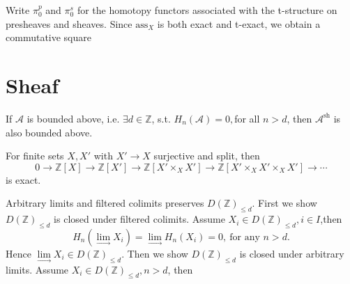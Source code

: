 \documentclass[UTF8,12,a4paper]{ctexart}
\theoremstyle{definition}
\begin{document}
Write $\pi_0^p$ and $\pi_0^s$ for the homotopy functors associated with the t-structure on presheaves and sheaves. Since $\text{ass}_X$ is both exact and t-exact, we obtain a commutative square

\begin{center}
\end{center}

























\newpage
\section{Sheaf}

\lem
If $\mathcal{A}$ is bounded above, i.e. $\exists d\in\mathbb{Z}$, s.t. $H_n (\mathcal{A})=0,$for all $n>d$, then $\mathcal{A}^{\text{sh}}$ is also bounded above.


\Q
For finite sets $X, X'$ with $X'\to X$ surjective and split, then 
$$
0\rightarrow\mathbb{Z}\left[X\right]\rightarrow\mathbb{Z}\left[X'\right]\rightarrow\mathbb{Z}\left[X'\times_{X} X'\right]\rightarrow\mathbb{Z}\left[X'\times_{X}X' \times_{X}X'\right]\rightarrow\cdots
$$
is exact.




















\lem
Arbitrary limits and filtered colimits preserves $D(\mathbb{Z})_{\leq d}$.
\pf
First we show $D(\mathbb{Z})_{\leq d}$ is closed under filtered colimits. Assume $X_i\in D(\mathbb{Z})_{\leq d}, i\in I$,then
$$
H_n(\underset{\longrightarrow}{\lim} X_i)=\underset{\longrightarrow}{\lim} H_n(X_i)=0, \ \text{for any } n>d.
$$
Hence $\underset{\longrightarrow}{\lim}X_i\in  D(\mathbb{Z})_{\leq d}.$
Then we show $ D(\mathbb{Z})_{\leq d}$ is closed under arbitrary limits. Assume $X_i\in  D(\mathbb{Z})_{\leq d}, n>d$, then
\end{document}
